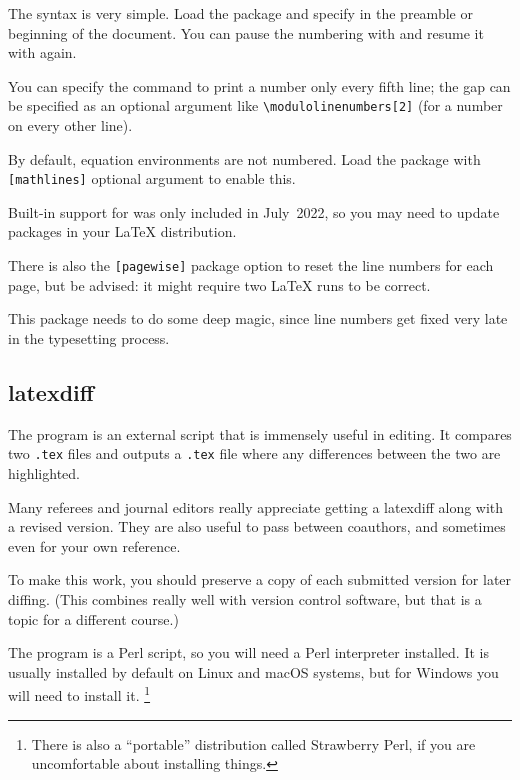 The syntax is very simple.
Load the package and specify  in the preamble or beginning of the document.
You can pause the numbering with  and resume it with  again.

You can specify the  command to print a number only every fifth line;
the gap can be specified as an optional argument like \verb|\modulolinenumbers[2]|
(for a number on every other line).

By default, equation environments are not numbered.
Load the package with \verb|[mathlines]| optional argument to enable this.

\begin{gotcha}
Built-in support for 
was only included in July~2022,
so you may need to update packages in your \LaTeX{} distribution.
\end{gotcha}

There is also the \verb|[pagewise]| package option
to reset the line numbers for each page, but be advised:
it might require two \LaTeX{} runs to be correct.

\begin{technote}
This package needs to do some deep magic,
since line numbers get fixed very late in the typesetting process.
\end{technote}


%
\subsection{latexdiff}

The  program is an external script that is immensely useful in editing.
It compares two \verb|.tex| files and outputs a \verb|.tex| file
where any differences between the two are highlighted.

\begin{practices}
Many referees and journal editors really appreciate getting a latexdiff along with a revised version.
They are also useful to pass between coauthors,
and sometimes even for your own reference.

To make this work, you should preserve a copy of each submitted version for later diffing.
(This combines really well with version control software,
but that is a topic for a different course.)
\end{practices}

The  program is a Perl script,
so you will need a Perl interpreter installed.
It is usually installed by default on Linux and macOS systems,
but for Windows you will need to install it.%
\footnote{There is also a ``portable'' distribution called Strawberry Perl,
if you are uncomfortable about installing things.}

